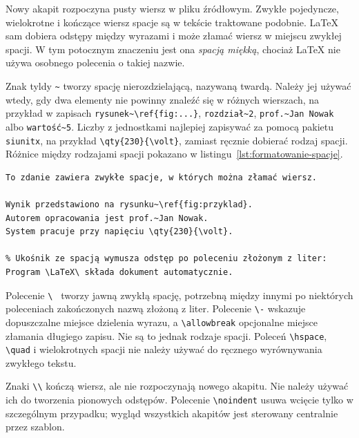 Nowy akapit rozpoczyna pusty wiersz w pliku źródłowym. Zwykłe pojedyncze, wielokrotne i kończące wiersz spacje są w tekście traktowane podobnie. LaTeX sam dobiera odstępy między wyrazami i może złamać wiersz w miejscu zwykłej spacji. W tym potocznym znaczeniu jest ona \emph{spacją miękką}, chociaż LaTeX nie używa osobnego polecenia o takiej nazwie.

Znak tyldy \verb|~| tworzy spację nierozdzielającą, nazywaną twardą. Należy jej używać wtedy, gdy dwa elementy nie powinny znaleźć się w różnych wierszach, na przykład w zapisach \verb|rysunek~\ref{fig:...}|, \verb|rozdział~2|, \verb|prof.~Jan Nowak| albo \verb|wartość~5|. Liczby z jednostkami najlepiej zapisywać za pomocą pakietu \texttt{siunitx}, na przykład \verb|\qty{230}{\volt}|, zamiast ręcznie dobierać rodzaj spacji. Różnice między rodzajami spacji pokazano w listingu~\ref{lst:formatowanie-spacje}.

\begin{lstlisting}[style=thesis,caption={Spacja zwykła, nierozdzielająca i jawna},label={lst:formatowanie-spacje}]
To zdanie zawiera zwykłe spacje, w których można złamać wiersz.

Wynik przedstawiono na rysunku~\ref{fig:przyklad}.
Autorem opracowania jest prof.~Jan Nowak.
System pracuje przy napięciu \qty{230}{\volt}.

% Ukośnik ze spacją wymusza odstęp po poleceniu złożonym z liter:
Program \LaTeX\ składa dokument automatycznie.
\end{lstlisting}

Polecenie \verb|\ | tworzy jawną zwykłą spację, potrzebną między innymi po niektórych poleceniach zakończonych nazwą złożoną z liter. Polecenie \verb|\-| wskazuje dopuszczalne miejsce dzielenia wyrazu, a \verb|\allowbreak| opcjonalne miejsce złamania długiego zapisu. Nie są to jednak rodzaje spacji. Poleceń \verb|\hspace|, \verb|\quad| i wielokrotnych spacji nie należy używać do ręcznego wyrównywania zwykłego tekstu.

Znaki \verb|\\| kończą wiersz, ale nie rozpoczynają nowego akapitu. Nie należy używać ich do tworzenia pionowych odstępów. Polecenie \verb|\noindent| usuwa wcięcie tylko w szczególnym przypadku; wygląd wszystkich akapitów jest sterowany centralnie przez szablon.

\section{}

